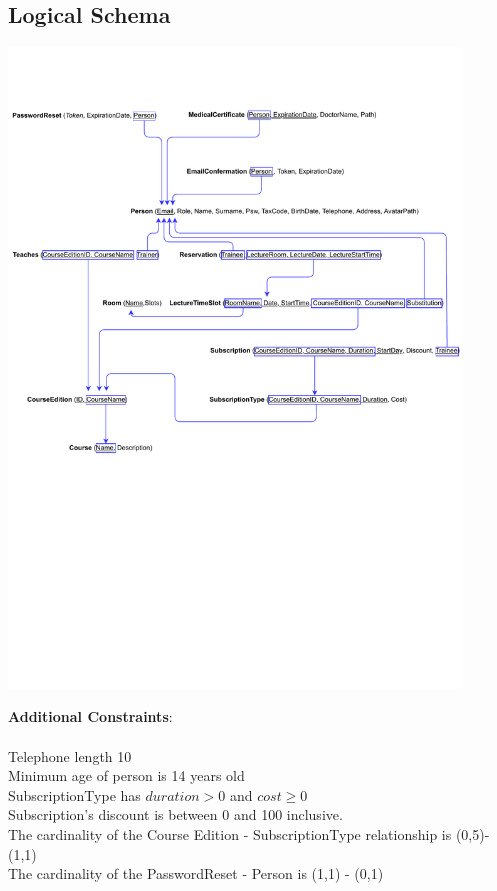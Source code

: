 \subsection{Logical Schema}
    \begin{center}
		\includegraphics[width=0.9\textwidth,bb = 0 380 700 850,clip=true]{resources/Logical_Schema.pdf}
    \end{center}

    
	\textbf{Additional Constraints}:\\\\
    Telephone length 10\\
    Minimum age of person is 14 years old\\
    SubscriptionType has $duration > 0$ and $cost \ge 0$\\
    Subscription's discount is between 0 and 100 inclusive.\\
    The cardinality of the Course Edition - SubscriptionType relationship is (0,5)-(1,1)\\
    The cardinality of the PasswordReset - Person is (1,1) - (0,1)